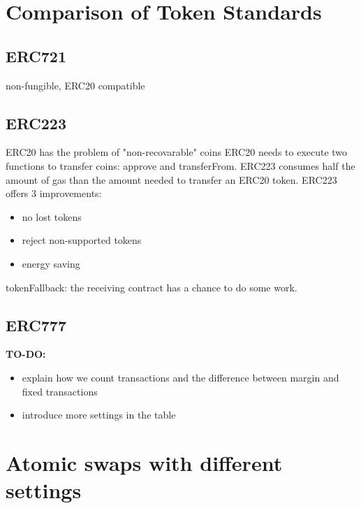\section{Comparison of Token Standards}
\subsection{ERC721}
non-fungible, ERC20 compatible
\subsection{ERC223}
ERC20 has the problem of "non-recovarable" coins
ERC20 needs to execute two functions to transfer coins: approve and transferFrom. ERC223 consumes half the amount of gas than the amount needed to transfer an ERC20 token.
ERC223 offers 3 improvements:
\begin{itemize}
  \item no lost tokens
  \item reject non-supported tokens
  \item energy saving
\end{itemize}

tokenFallback: the receiving contract has a chance to do some work.
\subsection{ERC777}


\textbf{TO-DO:}
\begin{itemize}
  \item explain how we count transactions and the difference between margin and fixed transactions
  \item introduce more settings in the table
\end{itemize}

\section{Atomic swaps with different settings}

